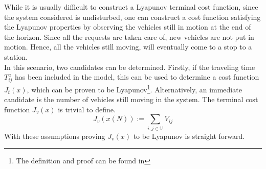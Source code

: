 While it is usually difficult to construct a Lyapunov terminal cost function, since the system considered is undisturbed, one can construct a cost function satisfying the Lyapunov properties by observing the vehicles still in motion at the end of the horizon. Since all the requests are taken care of, new vehicles are not put in motion. Hence, all the vehicles still moving, will eventually come to a stop to a station. \\
In this scenario, two candidates can be determined. Firstly, if the traveling time $T_{ij}^a$ has been included in the model, this can be used to determine a cost function $J_t(x)$, which can be proven to be Lyapunov\footnote{The definition and proof can be found in  }. Alternatively, an immediate candidate is the number of vehicles still moving in the system. The terminal cost function $J_v(x)$ is trivial to define. \\
\begin{equation}
	 J_v(x(N)):= \sum_{i,j \in \mathcal{V}}V_{ij}\label{eq:cost_function_v}
\end{equation}
With these assumptions proving $J_v(x)$ to be Lyapunov is straight forward. \\

